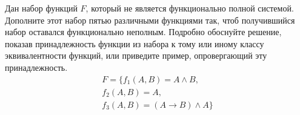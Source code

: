\question
Дан набор функций $F$, который не является функционально полной системой. Дополните этот набор пятью различными функциями так, чтоб получившийся набор оставался функционально неполным. Подробно обоснуйте решение, показав  принадлежность функции из набора к тому или иному классу эквивалентности функций, или приведите пример, опровергающий эту принадлежность.  
\begin{gather*}
F = \{f_1(A,B) = A \land B, \\
f_2(A,B) = A, \\
f_3(A,B) = (A \to B)\land A\}
\end{gather*}

